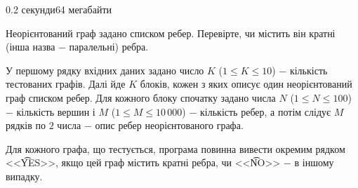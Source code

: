 \begin{problem}{}{}{}{0.2 секунди}{64 мегабайти}

Неорієнтований граф задано списком ребер. Перевірте, чи містить він кратні (інша назва $-$ паралельні) ребра.

\InputFile
У першому рядку вхідних даних задано число $K$ ($1 \le K \le 10$) $-$ кількість тестованих графів. 
Далі йде $K$ блоків, кожен з яких описує один неорієнтований граф списком ребер. 
Для кожного блоку спочатку задано числа $N$ ($1 \le N \le 100$) $-$ кількість вершин і $M$ ($1 \le M \le 10\,000$) $-$
кількість ребер, а потім слідує $M$ рядків по $2$ числа $-$ опис ребер неорієнтованого графа.

\OutputFile
Для кожного графа, що тестується, програма повинна вивести окремим рядком <<{\t{YES}}>>, якщо цей граф
містить кратні ребра, чи <<{\t{NO}}>> $-$ в іншому випадку.

\Example

\begin{example}
%
\end{example}

\end{problem}

